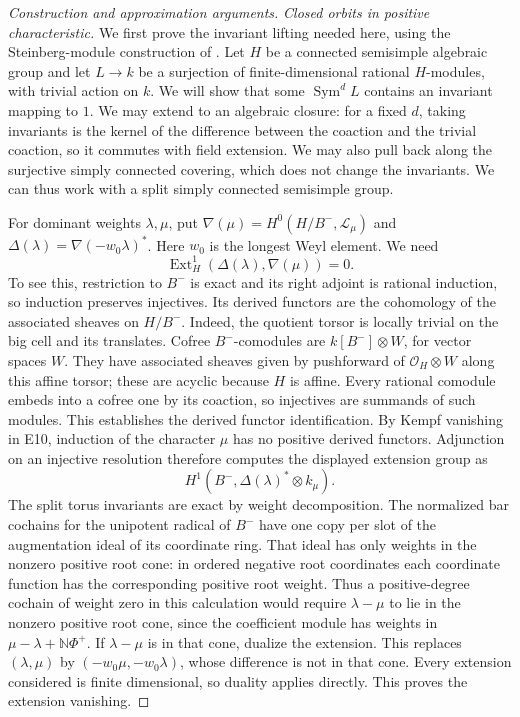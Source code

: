 \documentclass[11pt,a4paper,openany,oneside]{book}
\theoremstyle{resultstyle}
\theoremstyle{definition}
\numberwithin{equation}{chapter}
\begin{document}
\begin{proof}[Construction and approximation arguments]
\medskip\noindent
\textit{Closed orbits in positive characteristic.}
We first prove the invariant lifting needed here, using the
Steinberg-module construction of \cite[Sections 3.2--3.4]{franjouvdK}. Let \(H\) be a connected semisimple algebraic group
and let \(L\to k\) be a surjection of finite-dimensional rational
\(H\)-modules, with trivial action on \(k\). We will show that
some \(\operatorname{Sym}^dL\) contains an invariant mapping to
\(1\). We may extend to an algebraic closure: for a fixed \(d\),
taking invariants is the kernel of the difference between
the coaction and the trivial coaction, so it commutes with field
extension. We may also pull back along the surjective simply
connected covering, which does not change the invariants. We
can thus work with a split simply connected semisimple group.

For dominant weights \(\lambda,\mu\), put
\(\nabla(\mu)=H^0(H/B^-,\mathcal L_\mu)\) and
\(\Delta(\lambda)=\nabla(-w_0\lambda)^*\). Here \(w_0\) is the
longest Weyl element. We need
\[
 \operatorname{Ext}^1_H(\Delta(\lambda),\nabla(\mu))=0 .
\]
To see this, restriction to \(B^-\) is exact and its right
adjoint is rational induction, so induction preserves
injectives. Its derived functors are the cohomology of the
associated sheaves on \(H/B^-\). Indeed, the quotient torsor is
locally trivial on the big cell and its translates. Cofree
\(B^-\)-comodules are \(k[B^-]\otimes W\), for vector spaces \(W\).
They have associated sheaves given by pushforward of
\(\mathcal O_H\otimes W\) along this affine torsor; these are
acyclic because \(H\) is affine. Every rational comodule
embeds into a cofree one by its coaction, so injectives are
summands of such modules. This establishes the derived
functor identification. By Kempf vanishing in E10, induction
of the character \(\mu\) has no positive derived functors.
Adjunction on an injective resolution therefore computes the
displayed extension group as
\[
 H^1(B^-,\Delta(\lambda)^*\otimes k_\mu).
\]
The split torus invariants are exact by weight decomposition.
The normalized bar cochains for the unipotent radical of \(B^-\)
have one copy per slot of the augmentation ideal of its
coordinate ring. That ideal has only weights in the nonzero
positive root cone: in ordered negative root coordinates
each coordinate function has the corresponding positive root
weight. Thus a positive-degree cochain of weight zero in this
calculation would require \(\lambda-\mu\) to lie in the nonzero
positive root cone, since the coefficient module has weights
in \(\mu-\lambda+\mathbb N\Phi^+\). If \(\lambda-\mu\) is in
that cone, dualize the extension. This replaces
\((\lambda,\mu)\) by \((-w_0\mu,-w_0\lambda)\), whose difference
is not in that cone. Every extension considered is finite
dimensional, so duality applies directly. This proves the
extension vanishing.


\end{proof}
\end{document}
